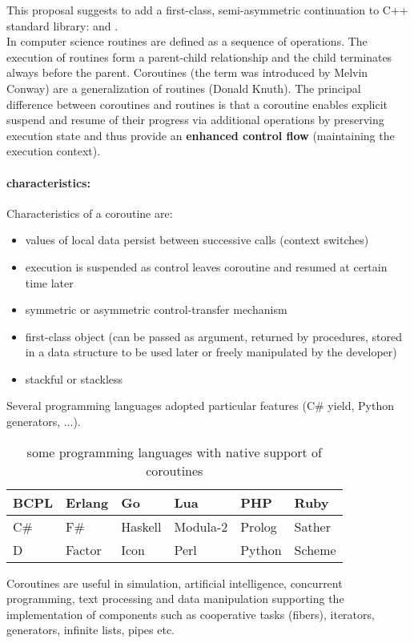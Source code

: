 
This proposal suggests to add a first-class, semi-asymmetric continuation to
C++ standard library: \pullcoro and \pushcoro.\\
\newline
In computer science routines are defined as a sequence of operations. The
execution of routines form a parent-child relationship and the child terminates
always before the parent. Coroutines (the term was introduced by Melvin
Conway\cite{Conway1963}) are a generalization of routines (Donald
Knuth\cite{Knuth1997}). The principal difference between coroutines and routines
is that a coroutine enables explicit suspend and resume of their progress via
additional operations by preserving execution state and thus provide an
{\bf enhanced control flow} (maintaining the execution context).\\

\paragraph*{characteristics:}
Characteristics\cite{Moura2009} of a coroutine are:
\begin{itemize}
    \item values of local data persist between successive calls (context
          switches)
    \item execution is suspended as control leaves coroutine and resumed at
          certain time later
    \item symmetric or asymmetric control-transfer mechanism
    \item first-class object (can be passed as argument, returned by procedures,
          stored in a data structure to be used later or freely manipulated by
          the developer)
    \item stackful or stackless
\end{itemize}

Several programming languages adopted particular features (C\# yield, Python
generators, ...).
\begin{table}[h]
    \centering
    \begin{tabular}{ l l l l l l }
        \midrule
        BCPL    &   Erlang  &   Go      &   Lua         &   PHP     &   Ruby \\
        \midrule
        C\#     &   F\#     &   Haskell &   Modula-2    &   Prolog  &   Sather \\
        \midrule
        D       &   Factor  &   Icon    &   Perl        &   Python  &   Scheme \\
        \midrule
    \end{tabular}
    \caption{some programming languages with native support of coroutines}
\end{table}
\newline
Coroutines are useful in simulation, artificial intelligence, concurrent
programming, text processing and data manipulation\cite{Moura2009} supporting
the implementation of components such as cooperative tasks (fibers), iterators,
generators, infinite lists, pipes etc.

